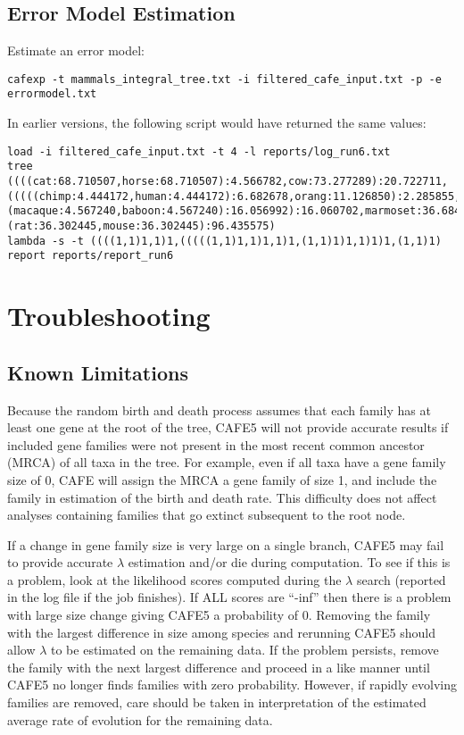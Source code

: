 \documentclass{article}
\newcommand{\shortname}{CAFE5 }
\begin{document}
\subsection{Error Model Estimation}
Estimate an error model:
\begin{lstlisting}
cafexp -t mammals_integral_tree.txt -i filtered_cafe_input.txt -p -e errormodel.txt
\end{lstlisting}
In earlier versions, the following script would have returned the same values:
\begin{lstlisting}
load -i filtered_cafe_input.txt -t 4 -l reports/log_run6.txt
tree ((((cat:68.710507,horse:68.710507):4.566782,cow:73.277289):20.722711,(((((chimp:4.444172,human:4.444172):6.682678,orang:11.126850):2.285855,gibbon:13.412706):7.211527,(macaque:4.567240,baboon:4.567240):16.056992):16.060702,marmoset:36.684935):57.315065):38.738021,(rat:36.302445,mouse:36.302445):96.435575)
lambda -s -t ((((1,1)1,1)1,(((((1,1)1,1)1,1)1,(1,1)1)1,1)1)1,(1,1)1)
report reports/report_run6
\end{lstlisting}

\section{Troubleshooting}
\subsection{Known Limitations}
Because the random birth and death process assumes that each family has at least one gene at the root of the tree, \shortname will not provide accurate results if included gene families were not present in the most recent common ancestor (MRCA) of all taxa in the tree. For example, even if all taxa have a gene family size of 0, CAFE will assign the MRCA a gene family of size 1, and include the family in estimation of the birth and death rate. This difficulty does not affect analyses containing families that go extinct subsequent to the root node.

If a change in gene family size is very large on a single branch, \shortname may fail to provide accurate $\lambda$ estimation and/or die during computation. To see if this is a problem, look at the likelihood scores computed during the $\lambda$ search (reported in the log file if the job finishes). If ALL scores are “-inf” then there is a problem with large size change giving \shortname a probability of 0. Removing the family with the largest difference in size among species and rerunning \shortname should allow $\lambda$ to be estimated on the remaining data. If the problem persists, remove the family with the next largest difference and proceed in a like manner until \shortname no longer finds families with zero probability. However, if rapidly evolving families are removed, care should be taken in interpretation of the estimated average rate of evolution for the remaining data.
\end{document}

